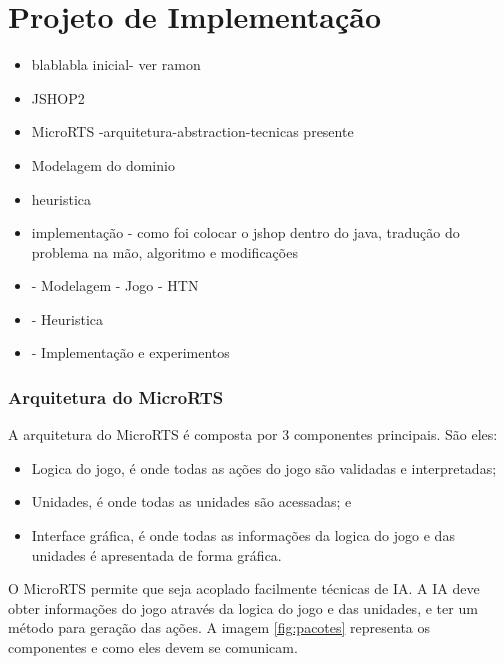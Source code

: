 
\chapter{\label{chap:impl}Projeto de Implementação}

\begin{itemize}
	\item blablabla inicial- ver ramon
	\item JSHOP2
	\item MicroRTS -arquitetura-abstraction-tecnicas presente
	\item Modelagem do dominio
	\item heuristica
	\item implementação - como foi colocar o jshop dentro do java, tradução do problema na mão, algoritmo e modificações
\end{itemize}



\begin{itemize}
	\item - Modelagem - Jogo - HTN
	\item - Heuristica
	\item - Implementação e experimentos
\end{itemize}






\subsection{Arquitetura do MicroRTS}

A arquitetura do MicroRTS é composta por 3 componentes principais. São eles:

\begin{itemize}
	\item Logica do jogo, é onde todas as ações do jogo são validadas e interpretadas;
	\item Unidades, é onde todas as unidades são acessadas; e
	\item Interface gráfica, é onde todas as informações da logica do jogo e das unidades é apresentada de forma gráfica.
\end{itemize}

O MicroRTS permite que seja acoplado facilmente técnicas de IA. A IA deve obter informações do jogo através da logica do jogo e das unidades, e ter um método para geração das ações. A imagem \ref{fig:pacotes} representa os componentes e como eles devem se comunicam.

